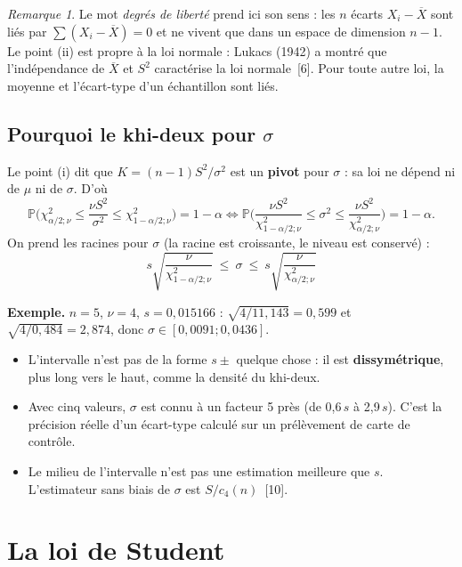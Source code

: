 \documentclass[11pt,a4paper]{article}
\theoremstyle{sj}
\theoremstyle{definition}
\theoremstyle{remark}
\newtheorem*{rem}{Remarque}
\providecommand{\og}{\guillemotleft\nobreakspace}
\providecommand{\fg}{\nobreakspace\guillemotright}
\newcommand{\Xb}{\overline{X}}
\renewcommand{\P}{\mathbb{P}}
\newcommand{\chid}{\chi^2}
\begin{document}
\begin{rem}
Le mot \emph{degrés de liberté} prend ici son sens : les $n$ écarts $X_i-\Xb$ sont liés par $\sum(X_i-\Xb)=0$ et ne vivent que dans un espace de dimension $n-1$. Le point (ii) est propre à la loi normale : Lukacs (1942) a montré que l'indépendance de $\Xb$ et $S^2$ caractérise la loi normale~[6]. Pour toute autre loi, la moyenne et l'écart-type d'un échantillon sont liés.
\end{rem}

\subsection{Pourquoi le khi-deux pour $\sigma$}

Le point (i) dit que $K=(n-1)S^2/\sigma^2$ est un \textbf{pivot} pour $\sigma$ : sa loi ne dépend ni de $\mu$ ni de $\sigma$. D'où
\[
\P\Big(\chid_{\alpha/2;\nu}\le\frac{\nu S^2}{\sigma^2}\le\chid_{1-\alpha/2;\nu}\Big)=1-\alpha
\iff
\P\Big(\frac{\nu S^2}{\chid_{1-\alpha/2;\nu}}\le\sigma^2\le\frac{\nu S^2}{\chid_{\alpha/2;\nu}}\Big)=1-\alpha.
\]
On prend les racines pour $\sigma$ (la racine est croissante, le niveau est conservé) :
\[
\boxed{\ s\sqrt{\frac{\nu}{\chid_{1-\alpha/2;\nu}}}\ \le\ \sigma\ \le\ s\sqrt{\frac{\nu}{\chid_{\alpha/2;\nu}}}\ }
\]

\textbf{Exemple.} $n=5$, $\nu=4$, $s=0{,}015166$ : $\sqrt{4/11{,}143}=0{,}599$ et $\sqrt{4/0{,}484}=2{,}874$, donc $\sigma\in[0{,}0091;0{,}0436]$.

\begin{attention}
\begin{itemize}[leftmargin=1.2em]
\item L'intervalle n'est pas de la forme $s\pm$ quelque chose : il est \textbf{dissymétrique}, plus long vers le haut, comme la densité du khi-deux.
\item Avec cinq valeurs, $\sigma$ est connu à un facteur 5 près (de 0,6\,$s$ à 2,9\,$s$). C'est la précision réelle d'un écart-type calculé sur un prélèvement de carte de contrôle.
\item Le milieu de l'intervalle n'est pas une estimation \og meilleure\fg{} que $s$. L'estimateur sans biais de $\sigma$ est $S/c_4(n)$~[10].
\end{itemize}
\end{attention}

\section{La loi de Student}\label{sec:student}
\end{document}
